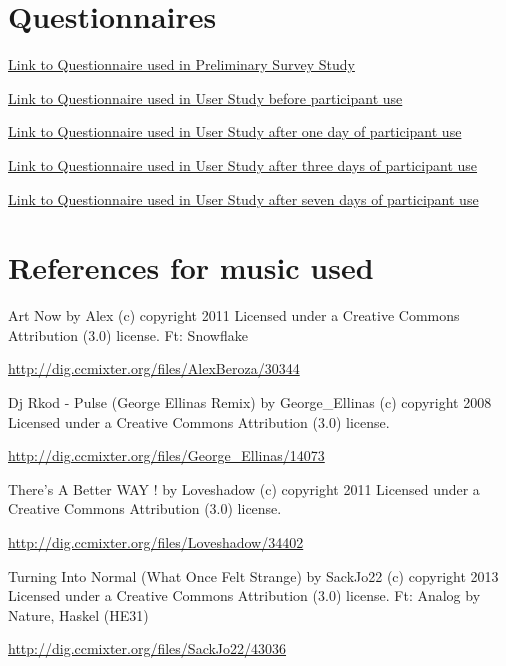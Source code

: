 \documentclass{l4proj}
\begin{document}
\begin{appendices}
\chapter{Questionnaires}
\begin{description}
    \item \href{https://docs.google.com/forms/d/1pakX7XYVLeoAOoYjkXVDSh09DWRrcNKFbN93KbzdtMg/prefill}{Link to Questionnaire used in Preliminary Survey Study}
\item
    \item \href{https://docs.google.com/forms/d/1JbD9k1n20KKGAkHvTEXJXE3pGRheN1uez2E0XOwcXZU/prefill}{Link to Questionnaire used in User Study before participant use}
\item
    \item \href{https://docs.google.com/forms/d/1sm2wlPlcC8mvK1OyvnOXUq5_tHZXC1h9BahmidPfutQ/prefill}{Link to Questionnaire used in User Study after one day of participant use}
\item
    \item \href{https://docs.google.com/forms/d/1heEV_uBCCTCK5g-J18M_eL7aD9sfJnWIl7B-Aie7A4c/prefill}{Link to Questionnaire used in User Study after three days of participant use}
\item
    \item \href{https://docs.google.com/forms/d/1NoNhfJRtZiw-utZUCW7sfjN9cYZxTzjtm8tA7g0-hdo/prefill}{Link to Questionnaire used in User Study after seven days of participant use}
\end{description}


\chapter{References for music used}
\begin{description}
    \item Art Now by Alex (c) copyright 2011 Licensed under a Creative Commons Attribution (3.0) license. Ft: Snowflake
    \item \url{http://dig.ccmixter.org/files/AlexBeroza/30344}
\item
    \item Dj Rkod - Pulse (George Ellinas Remix) by George\_Ellinas (c) copyright 2008 Licensed under a Creative Commons Attribution (3.0) license.
    \item \url{http://dig.ccmixter.org/files/George_Ellinas/14073 }
\item
    \item There's A Better WAY ! by Loveshadow (c) copyright 2011 Licensed under a Creative Commons Attribution (3.0) license. 
    \item \url{http://dig.ccmixter.org/files/Loveshadow/34402 }
\item
    \item Turning Into Normal (What Once Felt Strange) by SackJo22 (c) copyright 2013 Licensed under a Creative Commons Attribution (3.0) license. Ft: Analog by Nature, Haskel (HE31)
    \item \url{http://dig.ccmixter.org/files/SackJo22/43036}
\end{description}



\end{appendices}
\end{document}
